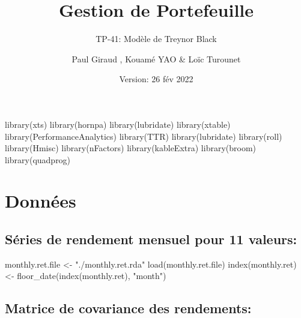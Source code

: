 \documentclass[
]{article}
\title{Gestion de Portefeuille}
\subtitle{TP-41: Modèle de Treynor Black}
\author{Paul Giraud , Kouamé YAO \& Loïc Turounet}
\date{Version: 26 fév 2022}
\newenvironment{Shaded}{\begin{snugshade}}{\end{snugshade}}
\newcommand{\FunctionTok}[1]{\textcolor[rgb]{0.00,0.00,0.00}{#1}}
\newcommand{\NormalTok}[1]{#1}
\newcommand{\OtherTok}[1]{\textcolor[rgb]{0.56,0.35,0.01}{#1}}
\newcommand{\StringTok}[1]{\textcolor[rgb]{0.31,0.60,0.02}{#1}}
\begin{document}
\maketitle

\begin{Shaded}
\begin{Highlighting}[]
\FunctionTok{library}\NormalTok{(xts)}
\FunctionTok{library}\NormalTok{(hornpa)}
\FunctionTok{library}\NormalTok{(lubridate)}
\FunctionTok{library}\NormalTok{(xtable)}
\FunctionTok{library}\NormalTok{(PerformanceAnalytics)}
\FunctionTok{library}\NormalTok{(TTR)}
\FunctionTok{library}\NormalTok{(lubridate)}
\FunctionTok{library}\NormalTok{(roll)}
\FunctionTok{library}\NormalTok{(Hmisc)}
\FunctionTok{library}\NormalTok{(nFactors)}
\FunctionTok{library}\NormalTok{(kableExtra)}
\FunctionTok{library}\NormalTok{(broom)}
\FunctionTok{library}\NormalTok{(quadprog)}
\end{Highlighting}
\end{Shaded}

\hypertarget{donnuxe9es}{%
\section{Données}\label{donnuxe9es}}

\hypertarget{suxe9ries-de-rendement-mensuel-pour-11-valeurs}{%
\subsection{Séries de rendement mensuel pour 11
valeurs:}\label{suxe9ries-de-rendement-mensuel-pour-11-valeurs}}

\begin{Shaded}
\begin{Highlighting}[]
\NormalTok{monthly.ret.file }\OtherTok{\textless{}{-}} \StringTok{"./monthly.ret.rda"}
\FunctionTok{load}\NormalTok{(monthly.ret.file)}
\FunctionTok{index}\NormalTok{(monthly.ret) }\OtherTok{\textless{}{-}} \FunctionTok{floor\_date}\NormalTok{(}\FunctionTok{index}\NormalTok{(monthly.ret), }\StringTok{"month"}\NormalTok{)}
\end{Highlighting}
\end{Shaded}

\hypertarget{matrice-de-covariance-des-rendements}{%
\subsection{Matrice de covariance des
rendements:}\label{matrice-de-covariance-des-rendements}}
\end{document}
